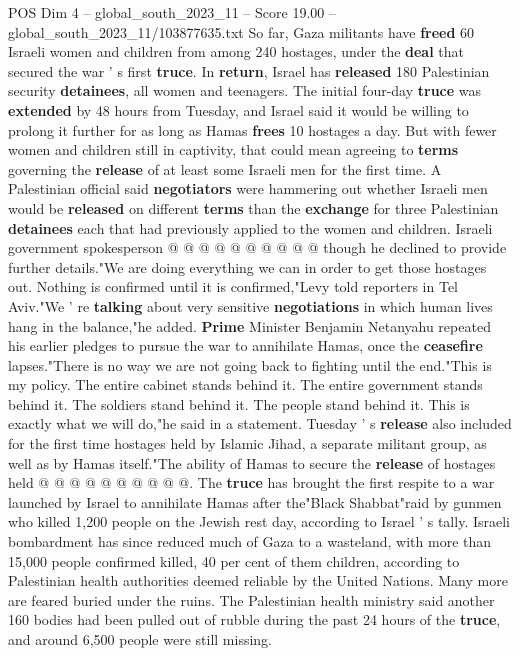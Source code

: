 \begin{textsample}{POS Dim 4 – global\_south\_2023\_11 – Score 19.00 – global\_south\_2023\_11/103877635.txt}
So far, Gaza militants have \textbf{freed} 60 Israeli women and children from among 240 hostages, under the \textbf{deal} that secured the war ' s first \textbf{truce}.
In \textbf{return}, Israel has \textbf{released} 180 Palestinian security \textbf{detainees}, all women and teenagers.
The initial four-day \textbf{truce} was \textbf{extended} by 48 hours from Tuesday, and Israel said it would be willing to prolong it further for as long as Hamas \textbf{frees} 10 hostages a day.
But with fewer women and children still in captivity, that could mean agreeing to \textbf{terms} governing the \textbf{release} of at least some Israeli men for the first time.
A Palestinian official said \textbf{negotiators} were hammering out whether Israeli men would be \textbf{released} on different \textbf{terms} than the \textbf{exchange} for three Palestinian \textbf{detainees} each that had previously applied to the women and children.
Israeli government spokesperson @ @ @ @ @ @ @ @ @ @ though he declined to provide further details."We are doing everything we can in order to get those hostages out.
Nothing is confirmed until it is confirmed,"Levy told reporters in Tel Aviv."We ' re \textbf{talking} about very sensitive \textbf{negotiations} in which human lives hang in the balance,"he added. \textbf{Prime} Minister Benjamin Netanyahu repeated his earlier pledges to pursue the war to annihilate Hamas, once the \textbf{ceasefire} lapses."There is no way we are not going back to fighting until the end."This is my policy.
The entire cabinet stands behind it.
The entire government stands behind it.
The soldiers stand behind it.
The people stand behind it.
This is exactly what we will do,"he said in a statement.
Tuesday ' s \textbf{release} also included for the first time hostages held by Islamic Jihad, a separate militant group, as well as by Hamas itself."The ability of Hamas to secure the \textbf{release} of hostages held @ @ @ @ @ @ @ @ @ @.
The \textbf{truce} has brought the first respite to a war launched by Israel to annihilate Hamas after the"Black Shabbat"raid by gunmen who killed 1,200 people on the Jewish rest day, according to Israel ' s tally.
Israeli bombardment has since reduced much of Gaza to a wasteland, with more than 15,000 people confirmed killed, 40 per cent of them children, according to Palestinian health authorities deemed reliable by the United Nations.
Many more are feared buried under the ruins.
The Palestinian health ministry said another 160 bodies had been pulled out of rubble during the past 24 hours of the \textbf{truce}, and around 6,500 people were still missing.

\end{textsample}
